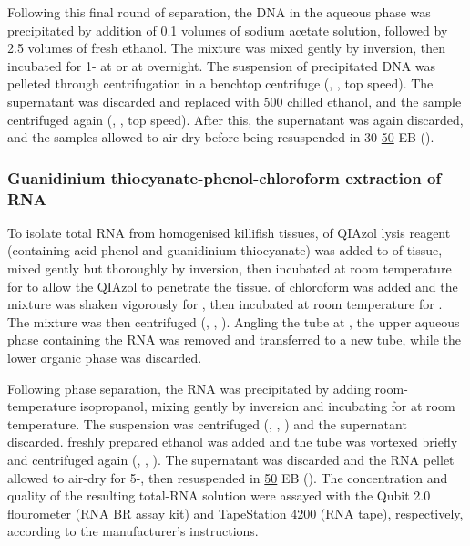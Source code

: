 Following this final round of separation, the DNA in the aqueous phase was precipitated by addition of 0.1 volumes of  sodium acetate solution, followed by 2.5 volumes of fresh  ethanol. The mixture was mixed gently by inversion, then incubated for 1- at  or at  overnight. The suspension of precipitated DNA was pelleted through centrifugation in a benchtop centrifuge (, , top speed). The supernatant was discarded and replaced with \ul{500} chilled  ethanol, and the sample centrifuged again (, , top speed). After this, the supernatant was again discarded, and the samples allowed to air-dry before being resuspended in 30-\ul{50} EB (). 

\subsubsection{Guanidinium thiocyanate-phenol-chloroform extraction of RNA}
\label{sec:methods_molec_standard_qiazol}


To isolate total RNA from homogenised killifish tissues,  of QIAzol lysis reagent (containing acid phenol and guanidinium thiocyanate) was added to  of tissue, mixed gently but thoroughly by inversion, then incubated at room temperature for  to allow the QIAzol to penetrate the tissue.  of chloroform was added and the mixture was shaken vigorously for , then incubated at room temperature for . The mixture was then centrifuged (, , ). Angling the tube at , the upper aqueous phase containing the RNA was removed and transferred to a new tube, while the lower organic phase was discarded.

Following phase separation, the RNA was precipitated by adding  room-temperature isopropanol, mixing gently by inversion and incubating for  at room temperature. The suspension was centrifuged (, , ) and the supernatant discarded.  freshly prepared  ethanol was added and the tube was vortexed briefly and centrifuged again (, , ). The supernatant was discarded and the RNA pellet allowed to air-dry for 5-, then resuspended in \ul{50} EB (). The concentration and quality of the resulting total-RNA solution were assayed with the Qubit 2.0 flourometer (RNA BR assay kit) and TapeStation 4200 (RNA tape), respectively, according to the manufacturer's instructions.

